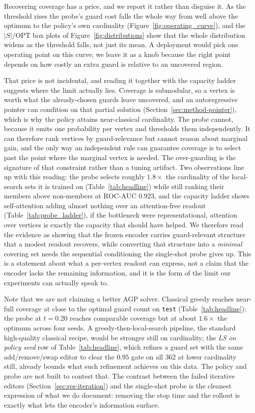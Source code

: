 \documentclass[11pt]{article}
\newcommand{\OPT}{\mathrm{OPT}}
\begin{document}
Recovering coverage has a price, and we report it rather than disguise it. As the threshold rises the probe's guard cost falls the whole way from well above the optimum to the policy's own cardinality (Figure~\ref{fig:operating_curve}), and the $|S|/\OPT$ box plots of Figure~\ref{fig:distributions} show that the whole distribution widens as the threshold falls, not just its mean. A deployment would pick one operating point on this curve; we leave it as a knob because the right point depends on how costly an extra guard is relative to an uncovered region.

That price is not incidental, and reading it together with the capacity ladder suggests where the limit actually lies. Coverage is submodular, so a vertex is worth what the already-chosen guards leave uncovered, and an autoregressive pointer can condition on that partial solution (Section~\ref{sec:method-pointer}), which is why the policy attains near-classical cardinality. The probe cannot, because it emits one probability per vertex and thresholds them independently. It can therefore rank vertices by guard-relevance but cannot reason about marginal gain, and the only way an independent rule can guarantee coverage is to select past the point where the marginal vertex is needed. The over-guarding is the signature of that constraint rather than a tuning artifact. Two observations line up with this reading: the probe selects roughly $1.8\times$ the cardinality of the local-search sets it is trained on (Table~\ref{tab:headline}) while still ranking their members above non-members at $\mathrm{ROC\text{-}AUC}$ $0.923$, and the capacity ladder shows self-attention adding almost nothing over an attention-free readout (Table~\ref{tab:probe_ladder}), if the bottleneck were representational, attention over vertices is exactly the capacity that should have helped. We therefore read the evidence as showing that the frozen encoder carries guard-relevant structure that a modest readout recovers, while converting that structure into a \emph{minimal} covering set needs the sequential conditioning the single-shot probe gives up. This is a statement about what a per-vertex readout can express, not a claim that the encoder lacks the remaining information, and it is the form of the limit our experiments can actually speak to.

Note that we are not claiming a better AGP solver. Classical greedy reaches near-full coverage at close to the optimal guard count on \texttt{test} (Table~\ref{tab:headline}); the probe at $t=0.20$ reaches comparable coverage but at about $1.6\times$ the optimum across four seeds. A greedy-then-local-search pipeline, the standard high-quality classical recipe, would be stronger still on cardinality; the \emph{LS on policy seed} row of Table~\ref{tab:headline}, which refines a guard set with the same add/remove/swap editor to clear the $0.95$ gate on all $362$ at lower cardinality still, already bounds what such refinement achieves on this data. The policy and probe are not built to contest that. The contrast between the failed iterative editors (Section~\ref{sec:res-iteration}) and the single-shot probe is the cleanest expression of what we do document: removing the stop time and the rollout is exactly what lets the encoder's information surface.
\end{document}
